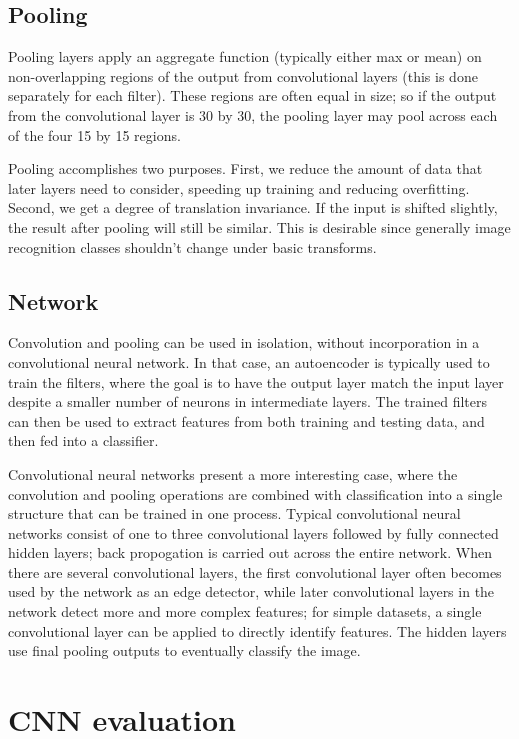 \documentclass[12pt,twocolumn]{article}
\begin{document}
\subsection{Pooling}

Pooling layers apply an aggregate function (typically either max or mean) on non-overlapping regions of the output from convolutional layers (this is done separately for each filter). These regions are often equal in size; so if the output from the convolutional layer is 30 by 30, the pooling layer may pool across each of the four 15 by 15 regions.

Pooling accomplishes two purposes. First, we reduce the amount of data that later layers need to consider, speeding up training and reducing overfitting. Second, we get a degree of translation invariance. If the input is shifted slightly, the result after pooling will still be similar. This is desirable since generally image recognition classes shouldn't change under basic transforms.

\subsection{Network}

Convolution and pooling can be used in isolation, without incorporation in a convolutional neural network. In that case, an autoencoder is typically used to train the filters, where the goal is to have the output layer match the input layer despite a smaller number of neurons in intermediate layers. The trained filters can then be used to extract features from both training and testing data, and then fed into a classifier.

Convolutional neural networks present a more interesting case, where the convolution and pooling operations are combined with classification into a single structure that can be trained in one process. Typical convolutional neural networks consist of one to three convolutional layers followed by fully connected hidden layers; back propogation is carried out across the entire network. When there are several convolutional layers, the first convolutional layer often becomes used by the network as an edge detector, while later convolutional layers in the network detect more and more complex features; for simple datasets, a single convolutional layer can be applied to directly identify features. The hidden layers use final pooling outputs to eventually classify the image.

\section{CNN evaluation} \label{sec:evalcnn}
\end{document}
